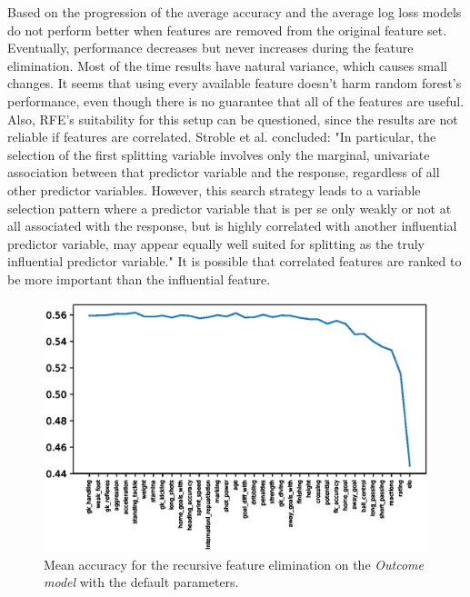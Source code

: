 Based on the progression of the average accuracy and the average log loss models do not perform better when features are removed from the original feature set. Eventually, performance decreases but never increases during the feature elimination. Most of the time results have natural variance, which causes small changes. It seems that using every available feature doesn't harm random forest's performance, even though there is no guarantee that all of the features are useful. Also, RFE's suitability for this setup can be questioned, since the results are not reliable if features are correlated. Stroble et al. concluded: "In particular, the selection of the first splitting variable involves only the marginal, univariate association between that predictor variable and the response, regardless of all other predictor variables. However, this search strategy leads to a variable selection pattern where a predictor variable that is per se only weakly or not at all associated with the response, but is highly correlated with another influential predictor variable, may appear equally well suited for splitting as the truly influential predictor variable." It is possible that correlated features are ranked to be more important than the influential feature.
\begin{figure}[H]
    \centering
    \includegraphics[width=1\textwidth]{img/default_avg_accuracy.eps}
    \caption{Mean accuracy for the recursive feature elimination on the \textit{Outcome model} with the default parameters.}
    \label{fig:def_avg_accu}
\end{figure}

